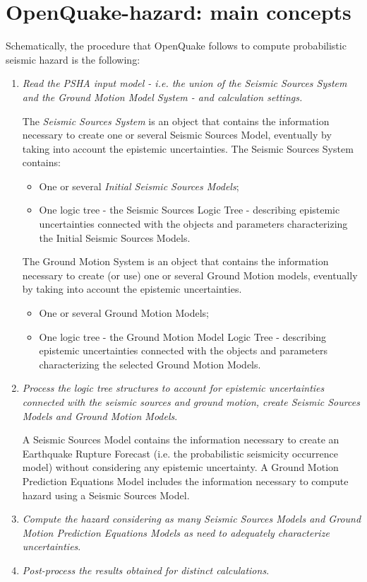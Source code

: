 \section{OpenQuake-hazard: main concepts}
Schematically, the procedure that OpenQuake follows to compute probabilistic 
seismic hazard is the following:
%
\begin{enumerate}
%
\item \emph{Read the PSHA input model - i.e. the union of the Seismic Sources 
System and the Ground Motion Model System - and calculation 
settings.}
	
	The \emph{Seismic Sources System} is an object that contains the 
	information necessary to create one or several Seismic Sources Model, 
	eventually by taking into account the epistemic uncertainties. 
	The Seismic Sources System contains:
	\begin{itemize}
	\item One or several \emph{Initial Seismic Sources Models};
	\item One logic tree - the Seismic Sources Logic Tree - describing 
	epistemic uncertainties connected with the objects and parameters 
	characterizing the Initial Seismic Sources Models.
	\end{itemize}
	
	The Ground Motion System is an object that contains the information 
	necessary to create (or use) one or several Ground Motion models, eventually 
	by taking into account the epistemic uncertainties. 
	\begin{itemize}
	\item One or several Ground Motion Models;
	\item One logic tree - the Ground Motion Model Logic Tree - 
	describing epistemic uncertainties connected with the objects and 
	parameters characterizing the selected Ground Motion Models.	
	\end{itemize}

%
\item \emph{Process the logic tree structures to account for epistemic 
uncertainties connected with the seismic sources and ground motion, 
create Seismic Sources Models and Ground Motion Models}.
	
	A Seismic Sources Model contains the information necessary to create an 
	Earthquake Rupture Forecast (i.e. the probabilistic seismicity occurrence
	model) without con\-sid\-er\-ing any epistemic uncertainty.
	A Ground Motion Prediction E\-qua\-tions Model includes the information 
	necessary to compute hazard using a Seismic Sources Model. 
\item \emph{Compute the hazard considering as many Seismic Sources Models and 
Ground Motion Prediction Equations Models as need to adequately characterize 
uncertainties}.
\item \emph{Post-process the results obtained for distinct calculations}.
\end{enumerate}
%
